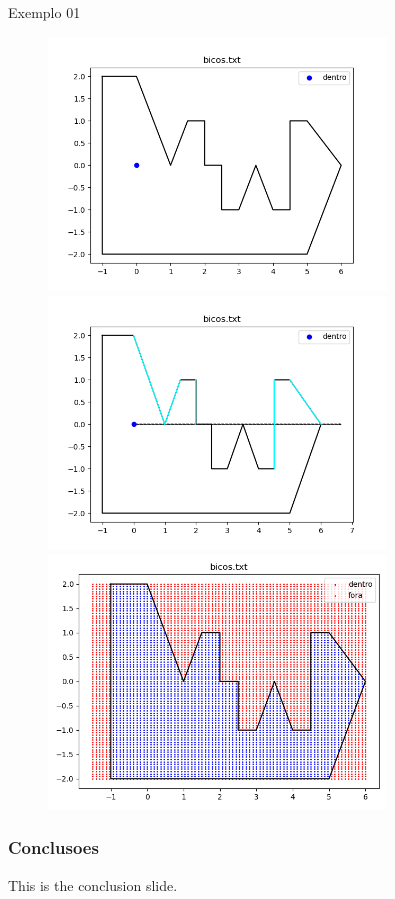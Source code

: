 \documentclass[aspectratio=169]{beamer}
\begin{document}
\begin{frame}{Exemplo 01}
  \begin{center}
    \begin{figure}
      \begin{overprint}
        \includegraphics[width=0.8\textwidth]{figures/bicos.png}
        \includegraphics[width=0.8\textwidth]{figures/bicos_marcados.png}
        \includegraphics[width=0.8\textwidth]{figures/bicos_grid.png}
      \end{overprint}
    \end{figure}
  \end{center}
\end{frame}


 

\begin{frame}
\frametitle{Conclusoes}
This is the conclusion slide.
\end{frame}
\end{document}
